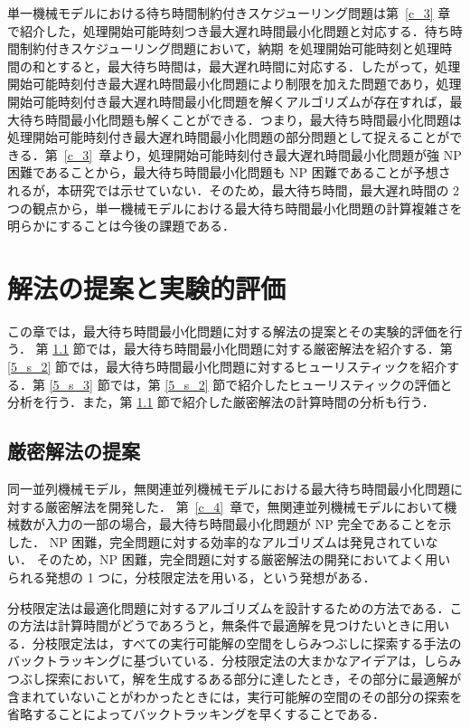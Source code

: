 \documentclass[12pt]{optlab-bachelor}
\begin{document}
単一機械モデルにおける待ち時間制約付きスケジューリング問題は第~\ref{c_3} 章で紹介した，処理開始可能時刻つき最大遅れ時間最小化問題と対応する．待ち時間制約付きスケジューリング問題において，納期 を処理開始可能時刻と処理時間の和とすると，最大待ち時間は，最大遅れ時間に対応する．したがって，処理開始可能時刻付き最大遅れ時間最小化問題により制限を加えた問題であり，処理開始可能時刻付き最大遅れ時間最小化問題を解くアルゴリズムが存在すれば，最大待ち時間最小化問題も解くことができる．つまり，最大待ち時間最小化問題は処理開始可能時刻付き最大遅れ時間最小化問題の部分問題として捉えることができる．第~\ref{c_3}~章より，処理開始可能時刻付き最大遅れ時間最小化問題が強 NP 困難であることから，最大待ち時間最小化問題も NP 困難であることが予想されるが，本研究では示せていない．そのため，最大待ち時間，最大遅れ時間の 2 つの観点から，単一機械モデルにおける最大待ち時間最小化問題の計算複雑さを明らかにすることは今後の課題である．


\chapter{解法の提案と実験的評価}\label{c_5}
この章では，最大待ち時間最小化問題に対する解法の提案とその実験的評価を行う．
第 \ref{5_s_1} 節では，最大待ち時間最小化問題に対する厳密解法を紹介する．第 \ref{5_s_2} 節では，最大待ち時間最小化問題に対するヒューリスティックを紹介する．第 \ref{5_s_3} 節では，第 \ref{5_s_2} 節で紹介したヒューリスティックの評価と分析を行う．また，第 \ref{5_s_1} 節で紹介した厳密解法の計算時間の分析も行う．

\section{厳密解法の提案}\label{5_s_1}
同一並列機械モデル，無関連並列機械モデルにおける最大待ち時間最小化問題に対する厳密解法を開発した．
第~\ref{c_4}~章で，無関連並列機械モデルにおいて機械数が入力の一部の場合，最大待ち時間最小化問題が NP 完全であることを示した．
NP 困難，完全問題に対する効率的なアルゴリズムは発見されていない．
そのため，NP 困難，完全問題に対する厳密解法の開発においてよく用いられる発想の 1 つに，分枝限定法を用いる，という発想がある．

分枝限定法は最適化問題に対するアルゴリズムを設計するための方法である．この方法は計算時間がどうであろうと，無条件で最適解を見つけたいときに用いる．分枝限定法は，すべての実行可能解の空間をしらみつぶしに探索する手法のバックトラッキングに基づいている．分枝限定法の大まかなアイデアは，しらみつぶし探索において，解を生成するある部分に達したとき，その部分に最適解が含まれていないことがわかったときには，実行可能解の空間のその部分の探索を省略することによってバックトラッキングを早くすることである．
\end{document}
